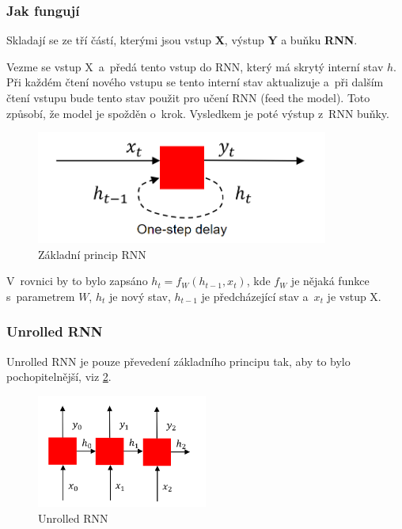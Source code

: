 \subsubsection{Jak fungují}

Skladají se ze tří částí, kterými jsou vstup \textbf{X}, výstup \textbf{Y} a buňku \textbf{RNN}.

Vezme se vstup X~a~předá tento vstup do RNN, který má skrytý interní stav $h$. 
Při každém čtení nového vstupu se tento interní stav aktualizuje a~při dalším čtení vstupu bude tento stav použit pro učení RNN (feed the model). 
Toto způsobí, že model je spožděn o~krok. 
Vysledkem je poté výstup z~RNN buňky.

\begin{figure}[h]
    \centering
	\includegraphics[height=10em]{images/09_RNN.png}
    \caption{Základní princip RNN}
    \label{RNN}
\end{figure}

V~rovnici by to bylo zapsáno $h_t = f_W(h_{t-1},x_t)$, kde $f_W$ je nějaká funkce s~parametrem $W$, $h_t$ je nový stav, $h_{t-1}$ je předcházející stav a~$x_t$ je vstup X.

\subsubsection{Unrolled RNN}

Unrolled RNN je pouze převedení základního principu tak, aby to bylo pochopitelnější, viz \ref{unrolledRNN}.

\begin{figure}[h]
    \centering
	\includegraphics[height=10em]{images/09_unrolled-RNN.png}
    \caption{Unrolled RNN}
    \label{unrolledRNN}
\end{figure}

